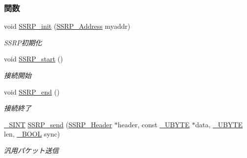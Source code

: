 \subsubsection*{関数}
\begin{DoxyCompactItemize}
\item 
void \hyperlink{ssrp_8h_ad964f70ed8d9649a41baab0685d06bff_ad964f70ed8d9649a41baab0685d06bff}{S\+S\+R\+P\+\_\+init} (\hyperlink{ssrp_8h_af52db94d5ce59044edabda26c25f92f9_af52db94d5ce59044edabda26c25f92f9}{S\+S\+R\+P\+\_\+\+Address} myaddr)
\begin{DoxyCompactList}\small\item\em S\+S\+R\+P初期化 \end{DoxyCompactList}\item 
void \hyperlink{ssrp_8h_a98e54ef5676da8f5590762971431fe63_a98e54ef5676da8f5590762971431fe63}{S\+S\+R\+P\+\_\+start} ()
\begin{DoxyCompactList}\small\item\em 接続開始 \end{DoxyCompactList}\item 
void \hyperlink{ssrp_8h_a27cdf3443b5ccc86e5d644b71059a6f5_a27cdf3443b5ccc86e5d644b71059a6f5}{S\+S\+R\+P\+\_\+end} ()
\begin{DoxyCompactList}\small\item\em 接続終了 \end{DoxyCompactList}\item 
\hyperlink{stddef_8h_aefd1068e35d26c0e7d7079ddf2579174_aefd1068e35d26c0e7d7079ddf2579174}{\+\_\+\+S\+I\+N\+T} \hyperlink{ssrp_8h_a2f0f6be0666e4a658d60acf37794c464_a2f0f6be0666e4a658d60acf37794c464}{S\+S\+R\+P\+\_\+send} (\hyperlink{ssrp_8h_d2/df5/structSSRP__Header}{S\+S\+R\+P\+\_\+\+Header} $\ast$header, const \hyperlink{stddef_8h_aac464b47452ce9406f88ef194e2becc1_aac464b47452ce9406f88ef194e2becc1}{\+\_\+\+U\+B\+Y\+T\+E} $\ast$data, \hyperlink{stddef_8h_aac464b47452ce9406f88ef194e2becc1_aac464b47452ce9406f88ef194e2becc1}{\+\_\+\+U\+B\+Y\+T\+E} len, \hyperlink{stddef_8h_afbf708854fe02af8475a9ba02f3196cb_afbf708854fe02af8475a9ba02f3196cb}{\+\_\+\+B\+O\+O\+L} sync)
\begin{DoxyCompactList}\small\item\em 汎用パケット送信 \end{DoxyCompactList}\item 

\end{DoxyCompactItemize}
